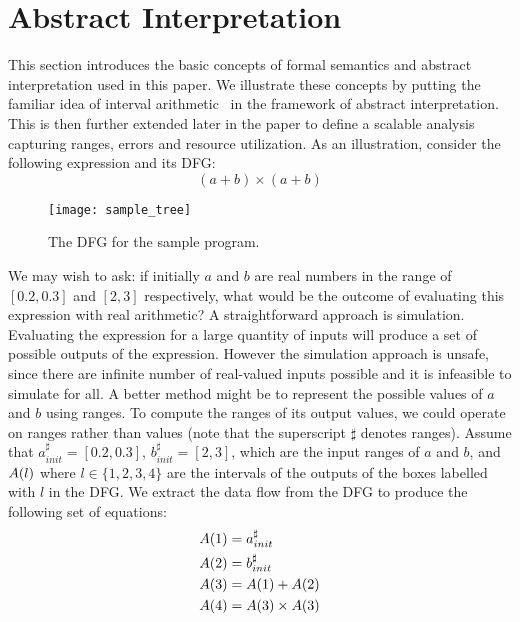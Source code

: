\section{Abstract Interpretation}
\label{sec:abstract_interpretation}

This section introduces the basic concepts of formal semantics and abstract
interpretation used in this paper. We illustrate these concepts by putting the
familiar idea of interval arithmetic~\cite{moore} in the framework of abstract
interpretation. This is then further extended later in the paper to define a
scalable analysis capturing ranges, errors and resource utilization. As an
illustration, consider the following expression and its DFG\@:
\begin{equation}
    (a + b) \times (a + b)
    \label{eq:absint_sample}
\end{equation}
\begin{figure}[ht]
    \centering
    \texttt{[image: sample\_tree]}
    \caption{The DFG for the sample program.}\label{fig:sample_tree}
\end{figure}%
We may wish to ask: if initially $a$ and $b$ are real numbers in the range of
$[0.2, 0.3]$ and $[2, 3]$ respectively, what would be the outcome of evaluating
this expression with real arithmetic? A straightforward approach is simulation.
Evaluating the expression for a large quantity of inputs will produce a set
of possible outputs of the expression. However the simulation approach is
unsafe, since there are infinite number of real-valued inputs possible and
it is infeasible to simulate for all. A better method might be to represent
the possible values of $a$ and $b$ using ranges. To compute the ranges of its
output values, we could operate on ranges rather than values (note that the
superscript $\sharp$ denotes ranges). Assume that $a^\sharp_{init} = [0.2,
0.3]$, $b^\sharp_{init} = [2, 3]$, which are the input ranges of $a$ and $b$,
and $A({l})$ where $l \in \{1, 2, 3, 4\}$ are the intervals of the outputs
of the boxes labelled with $l$ in the DFG\@. We extract the data flow from the
DFG to produce the following set of equations:
\begin{equation}
    \begin{aligned}
        A({1}) &= a^\sharp_{init} \\
        A({2}) &= b^\sharp_{init} \\
        A({3}) &= A({1}) + A({2}) \\
        A({4}) &= A({3}) \times A({3})
    \end{aligned}
    \label{eq:absint_sample_analysis}
\end{equation}
